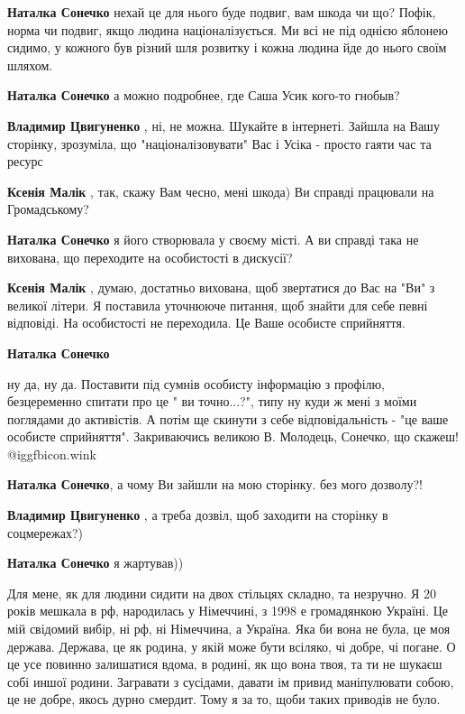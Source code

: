\begin{itemize}
\begin{itemize} %
\textbf{Наталка Сонечко} нехай це для нього буде подвиг, вам шкода чи що? Пофік, норма чи подвиг, якщо людина націоналізується. Ми всі не під однією яблонею сидимо, у кожного був різний шля розвитку і кожна людина йде до нього своїм шляхом.

\textbf{Наталка Сонечко} а можно подробнее, где Саша Усик кого-то гнобыв?

\textbf{Владимир Цвигуненко} , ні, не можна. Шукайте в інтернеті. Зайшла на Вашу сторінку, зрозуміла, що "націоналізовувати" Вас і Усіка - просто гаяти час та ресурс

\textbf{Ксенія Малік} , так, скажу Вам чесно, мені шкода) Ви справді працювали на Громадському?

\textbf{Наталка Сонечко} я його створювала у своєму місті. А ви справді така не вихована, що переходите на особистості в дискусії?

\textbf{Ксенія Малік} , думаю, достатньо вихована, щоб звертатися до Вас на "Ви" з великої літери. Я поставила уточнююче питання, щоб знайти для себе певні відповіді. На особистості не переходила. Це Ваше особисте сприйняття.

\textbf{Наталка Сонечко} 

ну да, ну да. Поставити під сумнів особисту інформацію з профілю, безцеременно
спитати про це " ви точно...?", типу ну куди ж мені з моїми поглядами до
активістів. А потім ще скинути з себе відповідальність - "це ваше особисте
сприйняття". Закриваючись великою В. Молодець, Сонечко, що скажеш!  @igg{fbicon.wink} 

\textbf{Наталка Сонечко}, а чому Ви зайшли на мою сторінку. без мого дозволу?!

\textbf{Владимир Цвигуненко} , а треба дозвіл, щоб заходити на сторінку в соцмережах?)

\textbf{Наталка Сонечко} я жартував))


\end{itemize} %


Для мене, як для людини сидити на двох стільцях складно, та незручно. Я 20
років мешкала в рф, народилась у Німеччині, з 1998 е громадянкою Україні. Це
мій свідомий вибір, ні рф, ні Німеччина, а Україна. Яка би вона не була, це моя
держава. Держава, це як родина, у якій може бути всіляко, чі добре, чі погане.
О це усе повинно залишатися вдома, в родині, як що вона твоя, та ти не шукаєш
собі иншої родини. Загравати з сусідами, давати ім привид маніпулювати собою,
це не добре, якось дурно смердит. Тому я за то, щоби таких приводів не було.


\end{itemize}
